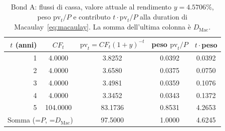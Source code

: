 \begin{table}[H]\centering\small
\caption{Bond A: flussi di cassa, valore attuale al rendimento $y=4.5706\%$, peso $\mathrm{pv}_t/P$ e contributo $t\cdot\mathrm{pv}_t/P$ alla duration di Macaulay~\eqref{eq:macaulay}. La somma dell'ultima colonna \`e $D_{\mathrm{Mac}}$.}
\label{tab:flussi-bondA}\renewcommand{\arraystretch}{1.15}
\begin{tabular}{rcccc}
\toprule
$t$ (anni) & $CF_t$ & $\mathrm{pv}_t=CF_t(1+y)^{-t}$ & peso $\mathrm{pv}_t/P$ & $t\cdot$peso\\
\midrule
\rowcolor{rowtint}1 & 4.0000 & 3.8252 & 0.0392 & 0.0392\\
2 & 4.0000 & 3.6580 & 0.0375 & 0.0750\\
\rowcolor{rowtint}3 & 4.0000 & 3.4981 & 0.0359 & 0.1076\\
4 & 4.0000 & 3.3452 & 0.0343 & 0.1372\\
\rowcolor{rowtint}5 & 104.0000 & 83.1736 & 0.8531 & 4.2653\\
\midrule
\multicolumn{2}{r}{Somma (=$P$, =$D_{\mathrm{Mac}}$)} & 97.5000 & 1.0000 & 4.6245\\
\bottomrule
\end{tabular}
\end{table}
